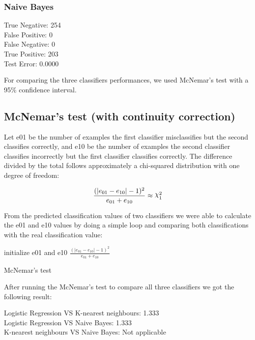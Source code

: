 \documentclass[a4paper]{article}
\DeclareRobustCommand{\rchi}{{\mathpalette\irchi\relax}}
\newcommand{\irchi}[2]{\raisebox{\depth}{$#1\chi$}}
\newcommand\tab[1][1cm]{\hspace*{#1}}
\begin{document}
\subsubsection{Naive Bayes}
        \tab True Negative: 254\\
        \tab False Positive: 0\\
        \tab False Negative: 0\\
        \tab True Positive: 203\\
        \tab Test Error: 0.0000

\bigbreak
For comparing the three classifiers performances, we used McNemar's test with a 95\% confidence interval.

\subsection{McNemar's test (with continuity correction)}
Let e01 be the number of examples the first classifier
misclassifies but the second classifies correctly, and e10 be the number of examples the second classifier
classifies incorrectly but the first classifier classifies correctly. The difference divided by the total
follows approximately a chi-squared distribution with one degree of freedom:

\begin{equation}
\frac{(|e_{01} - e_{10}| - 1)^2}{e_{01}+e_{10}}\approx\rchi^2_{1}
\end{equation}

From the predicted classification values of two classifiers we were able to calculate the e01 and e10 values by 
doing a simple loop and comparing both classifications with the real classification value:\\

\begin{algorithm}[H]
	initialize e01 and e10\;
	\Return $\frac{(|e_{01} - e_{10}| - 1)^2}{e_{01}+e_{10}}$
	\caption{McNemar's test}
\end{algorithm}
\bigbreak

After running the McNemar's test to compare all three classifiers we got the following result:\\
\begin{center}
Logistic Regression VS K-nearest neighbours: 1.333\\
Logistic Regression VS Naive Bayes: 1.333\\
K-nearest neighbours VS Naive Bayes: Not applicable
\end{center}
\end{document}
